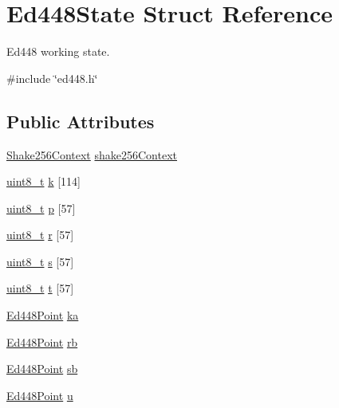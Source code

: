 \hypertarget{structEd448State}{}\section{Ed448\+State Struct Reference}
\label{structEd448State}


Ed448 working state.  




{\ttfamily \#include \char`\"{}ed448.\+h\char`\"{}}

\subsection*{Public Attributes}
\begin{DoxyCompactItemize}
\item 
\hyperlink{shake256_8h_a7c3af3f5a8bde59eb933705252280fff}{Shake256\+Context} \hyperlink{structEd448State_a80b6a03936367779610c7ec1f2cc27ad}{shake256\+Context}
\item 
\hyperlink{stdint_8h_aba7bc1797add20fe3efdf37ced1182c5}{uint8\+\_\+t} \hyperlink{structEd448State_adecc7312993a236e3df0d92af8bb2207}{k} \mbox{[}114\mbox{]}
\item 
\hyperlink{stdint_8h_aba7bc1797add20fe3efdf37ced1182c5}{uint8\+\_\+t} \hyperlink{structEd448State_a0f0eb37b77a1011d319079256fe00115}{p} \mbox{[}57\mbox{]}
\item 
\hyperlink{stdint_8h_aba7bc1797add20fe3efdf37ced1182c5}{uint8\+\_\+t} \hyperlink{structEd448State_ad5b8473d4a83e8fdd2c400f52c0bb64c}{r} \mbox{[}57\mbox{]}
\item 
\hyperlink{stdint_8h_aba7bc1797add20fe3efdf37ced1182c5}{uint8\+\_\+t} \hyperlink{structEd448State_a1072024363ba04b1a3162b1a0f0caa38}{s} \mbox{[}57\mbox{]}
\item 
\hyperlink{stdint_8h_aba7bc1797add20fe3efdf37ced1182c5}{uint8\+\_\+t} \hyperlink{structEd448State_a013f38fceb014e0929a015410ea960f0}{t} \mbox{[}57\mbox{]}
\item 
\hyperlink{structEd448Point}{Ed448\+Point} \hyperlink{structEd448State_a3f57a359818f62157012833c5126f8cf}{ka}
\item 
\hyperlink{structEd448Point}{Ed448\+Point} \hyperlink{structEd448State_ab000b2957cda8c96b2ea63f23de28381}{rb}
\item 
\hyperlink{structEd448Point}{Ed448\+Point} \hyperlink{structEd448State_a261c5effb4cc26327eb1d480be635ebb}{sb}
\item 
\hyperlink{structEd448Point}{Ed448\+Point} \hyperlink{structEd448State_a8b01461b3a9860a1e729c976b783ea77}{u}

\end{DoxyCompactItemize}
